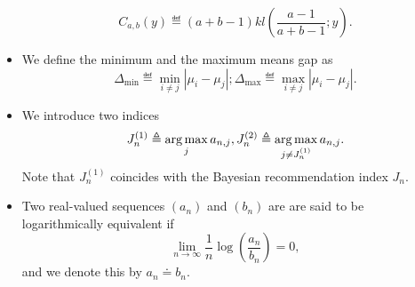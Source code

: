\begin{itemize}
    \[
        C_{a,b}(y) \eqdef (a+b-1) kl (\frac{a-1}{a+b-1}; y).
    \]
    \item We define the minimum and the maximum means gap as
    \[
        \Delta_{\text{min}} \eqdef \min_{i \neq j}|\mu_i-\mu_j|; \Delta_{\text{max}} \eqdef \max_{i \neq j}|\mu_i-\mu_j|.
    \]
    \item We introduce two indices
    \[
        J_n^{(1)} \triangleq \operatorname*{arg\,max}_{j} a_{n,j}, J_n^{(2)} \triangleq \operatorname*{arg\,max}_{j\neq J_n^{(1)}} a_{n,j}.
    \]
    Note that $J_n^{(1)}$ coincides with the Bayesian recommendation index $J_n$.
    \item Two real-valued sequences $(a_n)$ and $(b_n)$ are are said to be logarithmically equivalent if
    \[
        \lim_{n\rightarrow\infty}\frac{1}{n}\log\left(\frac{a_n}{b_n}\right) =0,
    \]
    and we denote this by $a_n \doteq b_n$.
\end{itemize}
